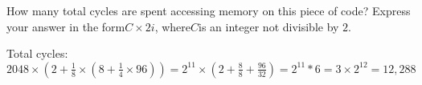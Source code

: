 \begin{blocksection}
\question
How many total cycles are spent accessing memory on this piece of code? Express your answer in the form ​$C \times 2i$​ ​, where ​$C$​ is an integer not divisible by $2$.

\begin{solution}[0.7in]
Total cycles: ​$2048 \times (2 + \frac{1}{8} \times (8 + \frac{1}{4} \times 96)) = 2^{11} \times (2 + \frac{8}{8} + \frac{96}{32}) = 2^{11} * 6 = 3 \times 2^{12} = 12,288$
\end{solution}
\end{blocksection}